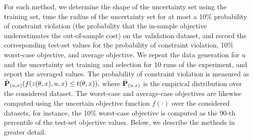 For each method, we determine the shape of the uncertainty set using the training set, tune the radius of the uncertainty set for at most a 10\% probability of constraint violation (the probability that the in-sample objective underestimates the out-of-sample cost) on the validation dataset, and record the corresponding test-set values for the probability of constraint violation, 10\% worst-case objective, and average objective. 
We repeat the data generation for $u$ and the uncertainty set training and selection for 10 runs of the experiment, and report the averaged values.
The probability of constraint violation is measured as 
$\hat{{\mathbf P}}_{(u,x)}(f(z(\theta,x),u,x) \leq t(\theta,x)),$
where $\hat{{\mathbf P}}_{(u,x)}$ is the empirical distribution over the considered dataset. 
The worst-case and average-case objectives are likewise computed using the uncertain objective function $f(\cdot)$ over the considered datasets, for instance, the 10\% worst-case objective is computed as the 90-th percentile of the test-set objective values. 
Below, we describe the methods in greater detail. 

